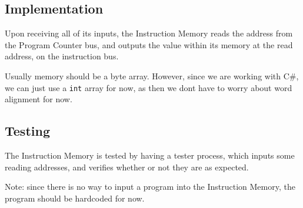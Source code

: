\documentclass{beamer}
\begin{document}
\subsection{Implementation}
\begin{frame}
    Upon receiving all of its inputs, the Instruction Memory reads the address
    from the Program Counter bus, and outputs the value within its memory at
    the read address, on the instruction bus.

    \vspace{\baselineskip}
    Usually memory should be a byte array. However, since we are working with
    C\#, we can just use a \texttt{int} array for now, as then we dont have to
    worry about word alignment for now.
\end{frame}
\subsection{Testing}
\begin{frame}
    The Instruction Memory is tested by having a tester process, which inputs
    some reading addresses, and verifies whether or not they are as expected.

    \vspace{\baselineskip}
    Note: since there is no way to input a program into the Instruction Memory,
    the program should be hardcoded for now.
\end{frame}
\end{document}
